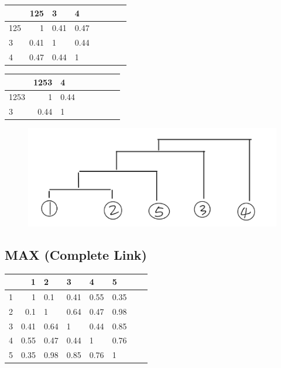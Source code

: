 \documentclass[11pt]{article}
\makeatletter
\def\maxwidth{\ifdim\Gin@nat@width>\linewidth\linewidth
    \else\Gin@nat@width\fi}
\let\Oldincludegraphics\includegraphics
\renewcommand{\includegraphics}[1]{\Oldincludegraphics[width=.8\maxwidth]{#1}}
\makeatother
\begin{document}
\begin{table}[H]
	\centering
	\begin{tabular}{|l|r|l|l|l|l|l|r|}
		\toprule
		{} &  125& 3 & 4 \\
		\midrule
		125 &  1 & 0.41 &    0.47 \\
		3 &  0.41 & 1 &   0.44 \\
		4 & 0.47 &  0.44 & 1\\
		\bottomrule
	\end{tabular}
\end{table}


\begin{table}[H]
	\centering
	\begin{tabular}{|l|r|l|l|l|l|l|r|}
		\toprule
		{} &  1253&  4 \\
		\midrule
		1253 &  1 & 0.44  \\
		3 &  0.44 & 1 \\
		\bottomrule
	\end{tabular}
\end{table}

\begin{figure}[H]
	\centering
	\includegraphics{4.png}
	\caption{}
\end{figure}


\subsection*{MAX (Complete Link)}

\begin{table}[H]
	\centering
	\begin{tabular}{|l|r|l|l|l|l|l|r|}
		\toprule
		{} &  1 & 2 &      3 & 4 &        5 \\
		\midrule
		1 &  1 & 0.1 & 0.41 &    0.55 & 0.35  \\
		2 &  0.1 & 1 &    0.64 & 0.47 &  0.98 \\
		3 &  0.41 & 0.64 &    1 & 0.44 &  0.85 \\
		4 &  0.55 & 0.47 &    0.44 & 1 &  0.76 \\
		5 &  0.35 & 0.98 &    0.85 & 0.76 &  1 \\
		\bottomrule
	\end{tabular}
\end{table}
\end{document}
